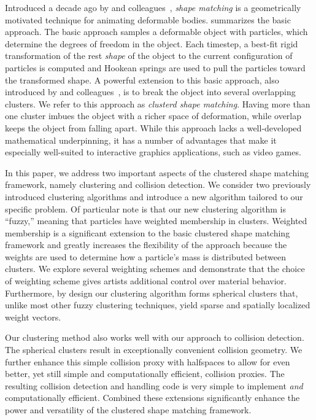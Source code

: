 \documentclass[review]{acmsiggraph}
\begin{document}
Introduced a decade ago by \Mueller and
colleagues~, 
{\em shape matching} is a
geometrically motivated technique for animating deformable bodies.
 summarizes the basic approach.
The basic approach samples a deformable object with particles, which
determine the degrees of freedom in the object.  Each timestep, a best-fit
rigid transformation of the rest {\em shape} of the object to the 
current configuration of particles is computed and Hookean springs
are used to pull the particles toward the transformed shape.
A powerful extension to this basic approach, also introduced by 
\Mueller and colleagues~, is to break the
object into several overlapping clusters.  We refer to this approach as
{\em clusterd shape matching}.  Having more than one cluster imbues
the object with a richer space of deformation, while overlap keeps
the object from falling apart.
While this approach lacks a well-developed mathematical
underpinning, it has a number of advantages that make it especially
well-suited to interactive graphics applications, such as video games.

In this paper, we address two important aspects of the clustered shape matching framework, namely clustering
and collision detection.
We consider two previously introduced clustering algorithms and introduce a new algorithm tailored to our
specific problem.
Of particular note is that our new clustering algorithm is ``fuzzy,'' 
meaning that particles have weighted membership in clusters.
Weighted membership is a significant extension to the basic clustered shape matching framework and greatly
increases the flexibility of the approach because the weights are used to determine how a particle's
mass is distributed between clusters.
We explore several weighting schemes and demonstrate that the choice of weighting scheme gives 
artists additional control over material behavior.
Furthermore, by design our clustering algorithm forms spherical clusters that, unlike most other fuzzy clustering
techniques, yield sparse and spatially localized weight vectors.

Our clustering method also works well with our approach to collision detection.  The spherical clusters
result in exceptionally convenient collision geometry.  We further 
enhance this simple collision proxy with halfspaces to allow for even better, yet still simple and computationally efficient, 
collision proxies.  The resulting collision detection and handling code is very simple to implement {\em and} computationally efficient.
Combined these extensions significantly enhance the power and versatility of the clustered shape matching framework.
\end{document}
